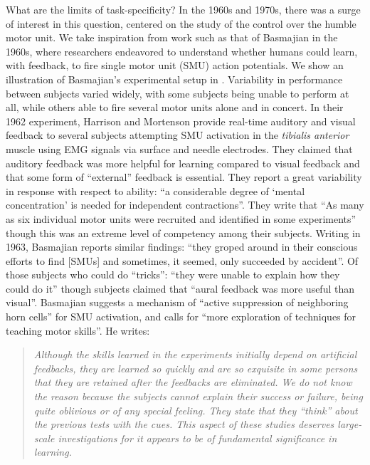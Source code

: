 \documentclass[../main.tex]{subfiles}
\begin{document}
What are the limits of task-specificity? In the 1960s and 1970s, there was a surge of interest in this question, centered on the study of the control over the humble motor unit. We take inspiration from work such as that of Basmajian in the 1960s, where researchers endeavored to understand whether humans could learn, with feedback, to fire single motor unit (SMU) action potentials. We show an illustration of Basmajian's experimental setup in . Variability in performance between subjects varied widely, with some subjects being unable to perform at all, while others able to fire several motor units alone and in concert. In their 1962 experiment, Harrison and Mortenson provide real-time auditory and visual feedback to several subjects attempting SMU activation in the \textit{tibialis anterior} muscle using EMG signals via surface and needle electrodes. They claimed that auditory feedback was more helpful for learning compared to visual feedback and that some form of ``external'' feedback is essential. They report a great variability in response with respect to ability: ``a considerable degree of `mental concentration' is needed for independent contractions''\cite{Harrison1962}. They write that ``As many as six individual motor units were recruited and identified in some experiments'' though this was an extreme level of competency among their subjects. Writing in 1963, Basmajian reports similar findings: ``they groped around in their conscious efforts to find [SMUs] and sometimes, it seemed, only succeeded by accident''. Of those subjects who could do ``tricks'': ``they were unable to explain how they could do it'' though subjects claimed that ``aural feedback was more useful than visual''\cite{Basmajian1963}. Basmajian suggests a mechanism of ``active suppression of neighboring horn cells'' for SMU activation, and calls for ``more exploration of techniques for teaching motor skills''. He writes:
%
\begin{quotation}
\noindent\textit{Although the skills learned in the experiments initially depend on artificial feedbacks, they are learned so quickly and are so exquisite in some persons that they are retained after the feedbacks are eliminated. We do not know the reason because the subjects cannot explain their success or failure, being quite oblivious or of any special feeling. They state that they ``think'' about the previous tests with the cues. This aspect of these studies deserves large-scale investigations for it appears to be of fundamental significance in learning.}
\end{quotation}
\end{document}
